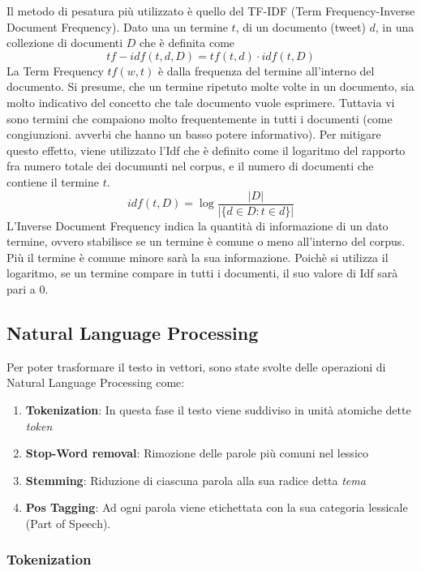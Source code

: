 Il metodo di pesatura più utilizzato è quello del TF-IDF (Term Frequency-Inverse Document Frequency).
Dato una un termine  $t$, di un documento (tweet) $d$, in una collezione di documenti $D$
che è definita come  
\begin{equation}
tf-idf(t,d, D) =  tf(t,d)\cdot idf(t,D)
\end{equation}
La Term Frequency $tf(w,t)$ è dalla frequenza del termine all'interno del documento. Si presume, che un termine     ripetuto molte volte in un documento, sia molto indicativo del concetto che tale documento vuole esprimere.
Tuttavia vi sono termini che compaiono molto frequentemente in tutti i documenti (come congiunzioni. avverbi che hanno un basso potere informativo).
Per  mitigare questo effetto, viene utilizzato l'Idf che è definito come il logaritmo del rapporto fra numero totale dei documunti nel corpus, e il numero di documenti che contiene il termine $t$.
\begin{equation}
idf(t, D) =  \log \frac{|D|}{|\{d \in D: t \in d\}|}
\end{equation}
L'Inverse Document Frequency   indica la quantità di informazione di un dato termine, ovvero stabilisce se un termine è comune o meno all'interno del corpus. Più il termine è comune minore sarà la sua informazione. 
Poichè si utilizza il logaritmo, se un termine compare in tutti i documenti, il suo valore di Idf sarà pari a 0.

\subsection{Natural Language Processing}
Per poter trasformare il testo in vettori, sono state svolte delle operazioni di Natural Language Processing come:
\begin{enumerate}
\item \textbf{Tokenization}: In questa fase il testo viene suddiviso in unità atomiche dette \emph{token}
\item \textbf{Stop-Word removal}: Rimozione delle parole più comuni nel lessico
\item \textbf{Stemming}: Riduzione di ciascuna parola alla sua radice detta \emph{tema}
\item \textbf{Pos Tagging}: Ad ogni parola viene etichettata con la sua categoria lessicale (Part of Speech).
\end{enumerate}
\subsubsection{Tokenization}


